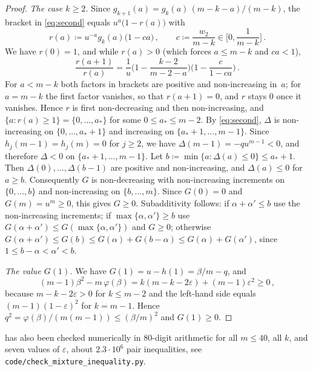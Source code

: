 \documentclass[11pt,letterpaper]{article}
\begin{document}
\begin{proof}
\emph{The case $k\ge2$.} Since $g_{k+1}(a)=g_k(a)\,(m-k-a)/(m-k)$, the bracket in \eqref{eq:second} equals $u^a\big(1-r(a)\big)$ with
\begin{equation*}
r(a)\coloneqq u^{-a}g_k(a)\big(1-ca\big)\,,\qquad c\coloneqq\frac{w_2}{m-k}\in\Big[0,\frac1{m-k}\Big]\,.
\end{equation*}
We have $r(0)=1$, and while $r(a)>0$ (which forces $a\le m-k$ and $ca<1$),
\begin{equation*}
\frac{r(a+1)}{r(a)}=\frac1u\Big(1-\frac{k-2}{m-2-a}\Big)\Big(1-\frac{c}{1-ca}\Big)\,.
\end{equation*}
For $a<m-k$ both factors in brackets are positive and non-increasing in~$a$; for $a=m-k$ the first factor vanishes, so that $r(a+1)=0$, and $r$ stays $0$ once it vanishes. Hence $r$ is first non-decreasing and then non-increasing, and $\{a\colon r(a)\ge1\}=\{0,\dots,a_*\}$ for some $0\le a_*\le m-2$. By \eqref{eq:second}, $\Delta$ is non-increasing on $\{0,\dots,a_*+1\}$ and increasing on $\{a_*+1,\dots,m-1\}$. Since $h_j(m-1)=h_j(m)=0$ for $j\ge2$, we have $\Delta(m-1)=-qu^{m-1}<0$, and therefore $\Delta<0$ on $\{a_*+1,\dots,m-1\}$. Let $b\coloneqq\min\{a\colon\Delta(a)\le0\}\le a_*+1$. Then $\Delta(0),\dots,\Delta(b-1)$ are positive and non-increasing, and $\Delta(a)\le0$ for $a\ge b$. Consequently $G$ is non-decreasing with non-increasing increments on $\{0,\dots,b\}$ and non-increasing on $\{b,\dots,m\}$. Since $G(0)=0$ and $G(m)=u^m\ge0$, this gives $G\ge0$. Subadditivity follows: if $\alpha+\alpha'\le b$ use the non-increasing increments; if $\max\{\alpha,\alpha'\}\ge b$ use $G(\alpha+\alpha')\le G(\max\{\alpha,\alpha'\})$ and $G\ge0$; otherwise $G(\alpha+\alpha')\le G(b)\le G(\alpha)+G(b-\alpha)\le G(\alpha)+G(\alpha')$, since $1\le b-\alpha<\alpha'<b$.

\emph{The value $G(1)$.} We have $G(1)=u-h(1)=\beta/m-q$, and
\begin{equation}\label{eq:G1}
(m-1)\beta^2-m\,\varphi(\beta)=k(m-k-2\varepsilon)+(m-1)\varepsilon^2\ge0\,,
\end{equation}
because $m-k-2\varepsilon>0$ for $k\le m-2$ and the left-hand side equals $(m-1)(1-\varepsilon)^2$ for $k=m-1$. Hence $q^2=\varphi(\beta)/(m(m-1))\le(\beta/m)^2$ and $G(1)\ge0$.
\end{proof}

\begin{remark}\label{rem:mixturecheck}
 has also been checked numerically in $80$-digit arithmetic for all $m\le40$, all $k$, and seven values of $\varepsilon$, about $2.3\cdot10^6$ pair inequalities, see \texttt{code/check\_mixture\_inequality.py}.
\end{remark}
\end{document}
